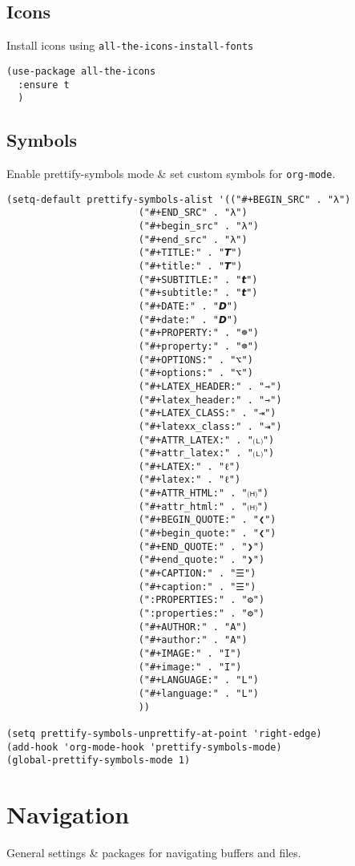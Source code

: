 \documentclass[11pt]{article}
\begin{document}
\subsection{Icons}
\label{sec:orgd998178}
Install icons using \texttt{all-the-icons-install-fonts}
\begin{verbatim}
(use-package all-the-icons
  :ensure t
  )
\end{verbatim}
\subsection{Symbols}
\label{sec:org89a6fe5}
Enable prettify-symbols mode \& set custom symbols for \texttt{org-mode}.
\begin{verbatim}
(setq-default prettify-symbols-alist '(("#+BEGIN_SRC" . "λ")
				       ("#+END_SRC" . "λ")
				       ("#+begin_src" . "λ")
				       ("#+end_src" . "λ")
				       ("#+TITLE:" . "𝙏")
				       ("#+title:" . "𝙏")
				       ("#+SUBTITLE:" . "𝙩")
				       ("#+subtitle:" . "𝙩")
				       ("#+DATE:" . "𝘿")
				       ("#+date:" . "𝘿")
				       ("#+PROPERTY:" . "☸")
				       ("#+property:" . "☸")
				       ("#+OPTIONS:" . "⌥")
				       ("#+options:" . "⌥")
				       ("#+LATEX_HEADER:" . "⇾")
				       ("#+latex_header:" . "⇾")
				       ("#+LATEX_CLASS:" . "⇥")
				       ("#+latexx_class:" . "⇥")
				       ("#+ATTR_LATEX:" . "🄛")
				       ("#+attr_latex:" . "🄛")
				       ("#+LATEX:" . "ℓ")
				       ("#+latex:" . "ℓ")
				       ("#+ATTR_HTML:" . "🄗")
				       ("#+attr_html:" . "🄗")
				       ("#+BEGIN_QUOTE:" . "❮")
				       ("#+begin_quote:" . "❮")
				       ("#+END_QUOTE:" . "❯")
				       ("#+end_quote:" . "❯")
				       ("#+CAPTION:" . "☰")
				       ("#+caption:" . "☰")
				       (":PROPERTIES:" . "⚙")
				       (":properties:" . "⚙")
				       ("#+AUTHOR:" . "A")
				       ("#+author:" . "A")
				       ("#+IMAGE:" . "I")
				       ("#+image:" . "I")
				       ("#+LANGUAGE:" . "L")
				       ("#+language:" . "L")
				       ))

(setq prettify-symbols-unprettify-at-point 'right-edge)
(add-hook 'org-mode-hook 'prettify-symbols-mode)
(global-prettify-symbols-mode 1)
\end{verbatim}

\section{Navigation}
\label{sec:org4a45ca5}
General settings \& packages for navigating buffers and files.
\end{document}
